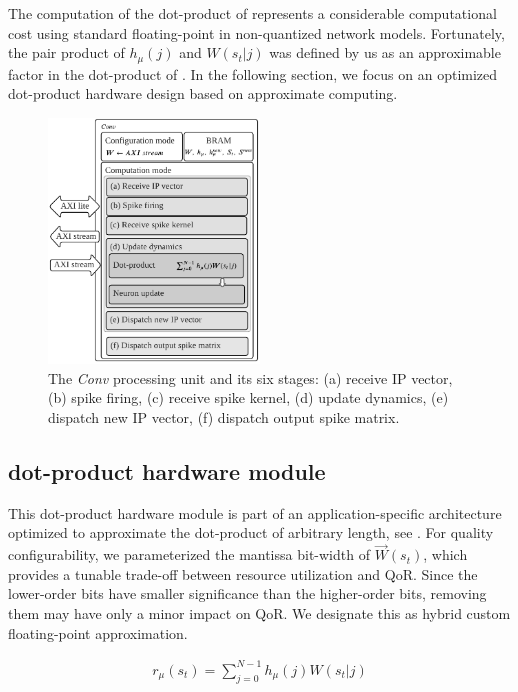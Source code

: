 The computation of the dot-product of  represents a considerable computational cost using standard floating-point in non-quantized network models. Fortunately, the pair product of $h_{\mu}(j)$ and $W(s_t|j)$ was defined by us as an approximable factor in the dot-product of . In the following section, we focus on an optimized dot-product hardware design based on approximate computing.


\begin{figure}[t!]
	\centering
	\includegraphics[width=0.5\textwidth]{../figures/sbs_conv.pdf}
	\caption{The \emph{Conv} processing unit and its six stages: (a) receive IP vector, (b) spike firing, (c) receive spike kernel, (d) update dynamics, (e) dispatch new IP vector, (f) dispatch output spike matrix.}
	\label{fig:hw_conv}
\end{figure}

\subsection{dot-product hardware module}
This dot-product hardware module is part of an application-specific architecture optimized to approximate the dot-product of arbitrary length, see . For quality configurability, we parameterized the mantissa bit-width of $\vec{W}(s_t)$, which provides a tunable trade-off between resource utilization and QoR. Since the lower-order bits have smaller significance than the higher-order bits, removing them may have only a minor impact on QoR. We designate this as hybrid custom floating-point approximation.

\begin{eqnarray} \label{eq:dot_product}
r_{\mu}\left(s_t\right)=\sum_{j=0}^{N-1}h_{\mu}(j)W(s_t|j)
\end{eqnarray}

